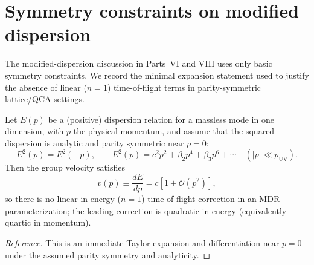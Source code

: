 \section{Symmetry constraints on modified dispersion}
\label{app:mdr_symmetry}
The modified-dispersion discussion in Parts~VI and VIII uses only basic symmetry constraints. We record the minimal expansion statement used to justify the absence of linear ($n=1$) time-of-flight terms in parity-symmetric lattice/QCA settings.

\begin{proposition}[Parity-symmetric analytic dispersion has no $n=1$ MDR term]
\label{prop:no_linear_mdr}
Let $E(p)$ be a (positive) dispersion relation for a massless mode in one dimension, with $p$ the physical momentum, and assume that the squared dispersion is analytic and parity symmetric near $p=0$:
\begin{equation}
    E^2(p)=E^2(-p),\qquad
    E^2(p)=c^2 p^2 + \beta_2 p^4 + \beta_3 p^6 + \cdots \quad (|p|\ll p_{\mathrm{UV}}).
\end{equation}
Then the group velocity satisfies
\begin{equation}
    v(p)\equiv \frac{dE}{dp}=c\left[1+\mathcal{O}(p^2)\right],
\end{equation}
so there is no linear-in-energy ($n=1$) time-of-flight correction in an MDR parameterization; the leading correction is quadratic in energy (equivalently quartic in momentum).
\end{proposition}
\begin{proof}[Reference]
This is an immediate Taylor expansion and differentiation near $p=0$ under the assumed parity symmetry and analyticity.
\end{proof}

